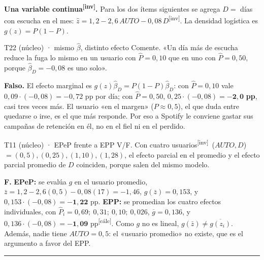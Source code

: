 \documentclass[10pt,a4paper]{article}
\newcommand{\inv}{\textsuperscript{\textcolor{red!60!black}{[inv]}}}
\newcommand{\calc}{\textsuperscript{\textcolor{blue!60!black}{[cálc]}}}
\newcommand{\acto}[1]{\vspace{6pt}{\large\bfseries #1}\par\vspace{2pt}\hrule\vspace{4pt}}
\newcommand{\Ph}{\hat P}
\begin{document}
\textbf{Una variable continua\inv.} Para los dos ítems siguientes se agrega $D=$ días con escucha en el mes: $\hat z=1{,}2-2{,}6\,AUTO-0{,}08\,D$\inv. La densidad logística es $g(z)=P(1-P)$.

\begin{enun}{T22 (núcleo) · mismo $\hat\beta$, distinto efecto}
Comente. «Un día más de escucha reduce la fuga lo mismo en un usuario con $\Ph=0{,}10$ que en uno con $\Ph=0{,}50$, porque $\hat\beta_D=-0{,}08$ es uno solo».
\end{enun}
\begin{ejemplar}
\textbf{Falso.} El efecto marginal es $g(z)\hat\beta_D=P(1-P)\hat\beta_D$: con $\Ph=0{,}10$ vale $0{,}09\cdot(-0{,}08)=-0{,}72$ pp por día; con $\Ph=0{,}50$, $0{,}25\cdot(-0{,}08)=\mathbf{-2{,}0}$ \textbf{pp}, casi tres veces más. El usuario «en el margen» ($P\approx0{,}5$), el que duda entre quedarse o irse, es el que más responde. Por eso a Spotify le conviene gastar sus campañas de retención en él, no en el fiel ni en el perdido.
\end{ejemplar}

\begin{enun}{T11 (núcleo) · EPeP frente a EPP}
V/F. Con cuatro usuarios\inv\ ($AUTO,D$) $=(0,5),(0,25),(1,10),(1,28)$, el efecto parcial en el promedio y el efecto parcial promedio de $D$ coinciden, porque salen del mismo modelo.
\end{enun}
\begin{ejemplar}
\textbf{F.} \textbf{EPeP:} se evalúa $g$ en el usuario promedio, $\bar z=1{,}2-2{,}6(0{,}5)-0{,}08(17)=-1{,}46$, $g(\bar z)=0{,}153$, y $0{,}153\cdot(-0{,}08)=\mathbf{-1{,}22}$ pp. \textbf{EPP:} se promedian los cuatro efectos individuales, con $\Ph_i=0{,}69;\ 0{,}31;\ 0{,}10;\ 0{,}026$, $\overline{g}=0{,}136$, y $0{,}136\cdot(-0{,}08)=\mathbf{-1{,}09}$ pp\calc. Como $g$ no es lineal, $g(\bar z)\neq\overline{g(z_i)}$. Además, nadie tiene $AUTO=0{,}5$: el «usuario promedio» no existe, que es el argumento a favor del EPP.
\end{ejemplar}

\acto{Acto 2. ¿Este tema será un hit dance? Clasificación con un logit real}
\end{document}
